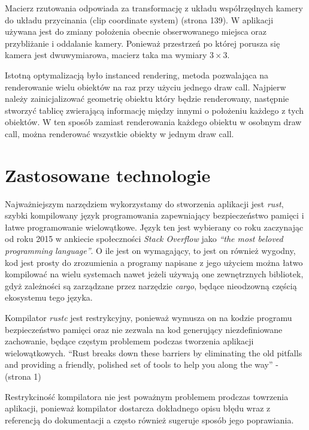 \documentclass[12pt, letterpaper]{report}
\begin{document}
    Macierz rzutowania odpowiada za transformację z układu współrzędnych kamery do układu przycinania 
    (clip coordinate system) \cite{grafika3d} (strona 139). W aplikacji używana jest do zmiany położenia 
    obecnie obserwowanego miejsca oraz przybliżanie i oddalanie kamery. Ponieważ przestrzeń po której porusza się
    kamera jest dwuwymiarowa, macierz taka ma wymiary $3 \times 3$.

    Istotną optymalizacją było instanced rendering, metoda pozwalająca na renderowanie wielu obiektów na raz 
    przy użyciu jednego draw call. Najpierw należy zainicjalizować geometrię obiektu który będzie renderowany, 
    następnie stworzyć tablicę zwierającą informację między innymi o położeniu każdego z tych obiektów. W ten sposób
    zamiast renderowania każdego obiektu w osobnym draw call, można renderować wszystkie obiekty w jednym draw call.

    \section{Zastosowane technologie}

    Najważniejszym narzędziem wykorzystamy do stworzenia aplikacji jest \emph{rust}, szybki kompilowany 
    język programowania zapewniający bezpieczeństwo pamięci i łatwe programowanie wielowątkowe. 
    Język ten jest wybierany co roku zaczynając od roku 2015 w ankiecie społeczności \emph{Stack Overflow} jako 
    \emph{``the most beloved programming language''}. O ile jest on wymagający, to jest 
    on również wygodny, kod jest prosty do zrozumienia a programy napisane z jego użyciem 
    można łatwo kompilować na wielu systemach nawet jeżeli używają one zewnętrznych bibliotek, gdyż 
    zależności są zarządzane przez narzędzie \emph{cargo}, będące nieodzowną częścią ekosystemu tego języka.

    Kompilator \emph{rustc} jest restrykcyjny, ponieważ wymusza on na kodzie programu bezpieczeństwo pamięci oraz
    nie zezwala na kod generujący niezdefiniowane zachowanie, będące częstym problemem podczas tworzenia aplikacji
    wielowątkowych. ``Rust breaks down these barriers by eliminating the old pitfalls and providing a friendly, 
    polished set of tools to help you along the way'' - \cite{rustbook} (strona 1)

    Restrykciność kompilatora nie jest poważnym problemem prodczas towrzenia aplikacji, ponieważ 
    kompilator dostarcza dokładnego opisu błędu wraz z referencją do dokumentacji a często również 
    sugeruje sposób jego poprawiania. \\
\end{document}
